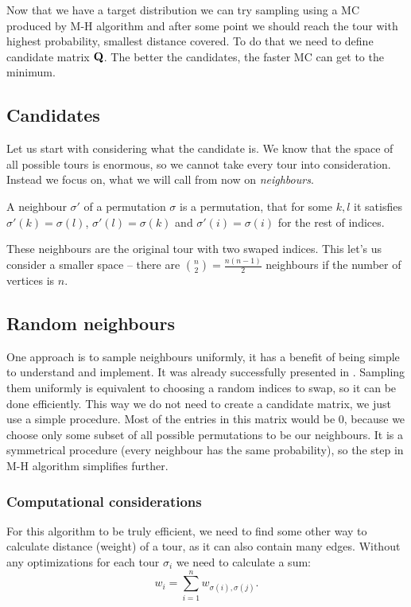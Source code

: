 Now that we have a target distribution we can try sampling using a MC produced by M-H algorithm and after some point we should reach the tour with highest probability, \ie smallest distance covered. To do that we need to define candidate matrix $\mathbf{Q}$. The better the candidates, the faster MC can get to the minimum.

\subsection{Candidates}
	Let us start with considering what the candidate is. We know that the space of all possible tours is enormous, so we cannot take every tour into consideration. Instead we focus on, what we will call from now on \textit{neighbours}.
	\begin{definition}
		A neighbour $\sigma'$ of a permutation $\sigma$ is a permutation, that for some $k, l$ it satisfies $\sigma'(k) = \sigma(l)$, $\sigma'(l) = \sigma(k)$ and $\sigma'(i) = \sigma(i)$ for the rest of indices.
	\end{definition}
	These neighbours are the original tour with two swaped indices. This let's us consider a smaller space -- there are $\binom{n}{2} = \frac{n(n-1)}{2}$ neighbours if the number of vertices is $n$.

\subsection{Random neighbours}
	One approach is to sample neighbours uniformly, it has a benefit of being simple to understand and implement. It was already successfully presented in \cite{decryption_tsp_MCMC}. Sampling them uniformly is equivalent to choosing a random indices to swap, so it can be done efficiently. This way we do not need to create a candidate matrix, we just use a simple procedure. Most of the entries in this matrix would be $0$, because we choose only some subset of all possible permutations to be our neighbours. It is a symmetrical procedure (every neighbour has the same probability), so the step in M-H algorithm simplifies further.
	
	\subsubsection{Computational considerations}
		For this algorithm to be truly efficient, we need to find some other way to calculate distance (weight) of a tour, as it can also contain many edges. Without any optimizations for each tour $\sigma_i$ we need to calculate a sum:
		\begin{equation*}
			w_i = \sum_{i=1}^{n} w_{\sigma(i), \sigma(j)}.
		\end{equation*}
		
